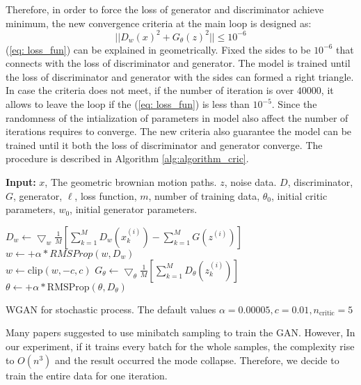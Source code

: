 \documentclass{article}
\begin{document}
	Therefore, in order to force the loss of generator and discriminator achieve minimum, the new convergence criteria at the main loop is designed as:
	\begin{equation}
	|| D_{w}(x)^{2} + G_{\theta}(z)^{2}|| \leq 10^{-6}
	\label{eq: loss_fun}
	\end{equation}
	(\ref{eq: loss_fun}) can be explained in geometrically.
	Fixed the sides to be $10^{-6}$ that connects with the loss of discriminator and generator.
	The model is trained until the loss of discriminator and generator with the sides can formed a right triangle.
	In case the criteria does not meet, if the number of iteration is over $40000$, it allows to leave the loop if the (\ref{eq: loss_fun}) is less than $10^{-5}$.
	Since the randomness of the intialization of parameters in model also affect the number of iterations requires to converge. 
	The new criteria also guarantee the model can be trained until it both the loss of discriminator and generator converge.
	The procedure is described in Algorithm \ref{alg:algorithm_cric}.
	
	\begin{algorithm}
		\textbf{Input:} $x$, The geometric brownian motion paths. $z$, noise data. $D$, discriminator, $G$, generator, $\ell$, loss function, $m$, number of training data, $\theta_0$, initial critic parameters, $w_0$, initial generator parameters.
		
		{
			
			{
				{
					$D_w \leftarrow \bigtriangledown_{w}\frac{1}{M}[\sum_{k=1}^{M}D_{w}(x_{k}^{(i)})-\sum_{k=1}^{M}G(z^{(i)})]$ \\
					$w \leftarrow + \alpha*RMSProp(w,D_w)$ \\
					$w \leftarrow \text{clip}(w,-c,c)$
				}
				$G_\theta \leftarrow \bigtriangledown_{\theta}\frac{1}{M}[\sum_{k=1}^{M}D_{\theta}(z_{k}^{(i)})]$
				$\theta \leftarrow + \alpha*\text{RMSProp}(\theta,D_\theta)$ 
			}
		}
		\caption{WGAN for stochastic process. The default values $\alpha = 0.00005, c=0.01, n_{\text{critic}}=5$}
		\label{alg:algorithm_cric}
	\end{algorithm} 
	
	Many papers suggested to use minibatch sampling to train the GAN. 
	However, In our experiment, if it trains every batch for the whole samples, the complexity rise to $O(n^3)$ and the result occurred the mode collapse. 
	Therefore, we decide to train the entire data for one iteration.
	
\end{document}
